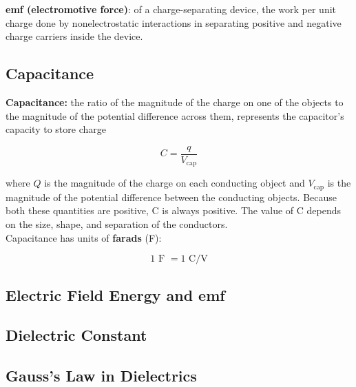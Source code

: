         \textbf{emf (electromotive force)}: of a charge-separating device, the work per unit charge done by nonelectrostatic interactions in separating positive and negative charge carriers inside the device.

    \subsection{Capacitance}    %

        \textbf{Capacitance:} the ratio of the magnitude of the charge on one of the objects to the magnitude of the potential difference across them, represents the capacitor's capacity to store charge

        \[
            C = \frac{q}{V_{\text{cap}}}
        \]

        where $Q$ is the magnitude of the charge on each conducting object and $V_{\text{cap}}$ is the magnitude of the potential difference between the conducting objects. Because both these quantities are positive, C
        is always positive. The value of C depends on the size, shape, and separation of the conductors. \\

        Capacitance has units of \textbf{farads} (F):

        \[
            1 \text{ F } = 1 \text{ C/V}
        \]



    \subsection{Electric Field Energy and emf}  %
    \subsection{Dielectric Constant}    %
    \subsection{Gauss's Law in Dielectrics}     %